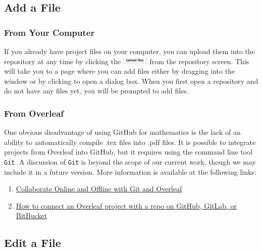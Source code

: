 \documentclass[11pt]{article}
\begin{document}
\subsection{Add a File}

\subsubsection{From Your Computer} 

If you already have project files on your computer, you can upload them into the repository at any time by clicking the \includegraphics[width=0.5in]{UploadFilesbutton} from the repository screen. This will take you to a page where you can add files either by dragging into the window or by clicking to open a dialog box. When you first open a repository and do not have any files yet, you will be prompted to add files. 

\subsubsection{From Overleaf}

One obvious disadvantage of using GitHub for mathematics is the lack of an ability to automatically compile .tex files into .pdf files. 
It is possible to integrate projects from Overleaf into GitHub, but it requires using the command line tool \texttt{Git}. A discussion of \texttt{Git} is beyond the scope of our current work, though we may include it in a future version. More information is available at the following links: \\

\begin{enumerate}
\item \href{https://www.overleaf.com/blog/195-new-collaborate-online-and-offline-with-overleaf-and-git-beta#.Wx6qPI5r06Y}{Collaborate Online and Offline with Git and Overleaf}
\item \href{https://www.overleaf.com/help/233-how-do-i-connect-an-overleaf-project-with-a-repo-on-github#.Wx6qfY5r06Y}{ How to connect an Overleaf project with a repo on GitHub, GitLab, or BitBucket}
\end{enumerate}

\subsection{Edit a File}
\end{document}
